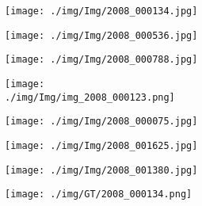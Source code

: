 \documentclass[10pt,twocolumn,letterpaper]{article}
\begin{document}
\begin{figure}[t]
\center
    \begin{subfigure}[t]{0.11\textwidth}
            \begin{subfigure}[t]{\textwidth}
                \texttt{[image: ./img/Img/2008\_000134.jpg]}
            \end{subfigure}\vspace{.1ex}

            \begin{subfigure}[t]{\textwidth}
                \texttt{[image: ./img/Img/2008\_000536.jpg]}
            \end{subfigure}\vspace{.1ex}

         \begin{subfigure}[t]{\textwidth}
                \texttt{[image: ./img/Img/2008\_000788.jpg]}
            \end{subfigure}\vspace{.1ex}

\begin{subfigure}[t]{\textwidth}
                \texttt{[image: ./img/Img/img\_2008\_000123.png]}
            \end{subfigure}\vspace{.1ex}

\begin{subfigure}[t]{\textwidth}
                \texttt{[image: ./img/Img/2008\_000075.jpg]}
            \end{subfigure}\vspace{.1ex}

\begin{subfigure}[t]{\textwidth}
                \texttt{[image: ./img/Img/2008\_001625.jpg]}
            \end{subfigure}\vspace{.1ex}

            \begin{subfigure}[t]{\textwidth}
                \texttt{[image: ./img/Img/2008\_001380.jpg]}
            \end{subfigure}
     \end{subfigure}
\begin{subfigure}[t]{0.11\textwidth}
        \begin{subfigure}[t]{\textwidth}
                \texttt{[image: ./img/GT/2008\_000134.png]}
            \end{subfigure}\vspace{.1ex}


\end{subfigure}
\end{figure}
\end{document}
